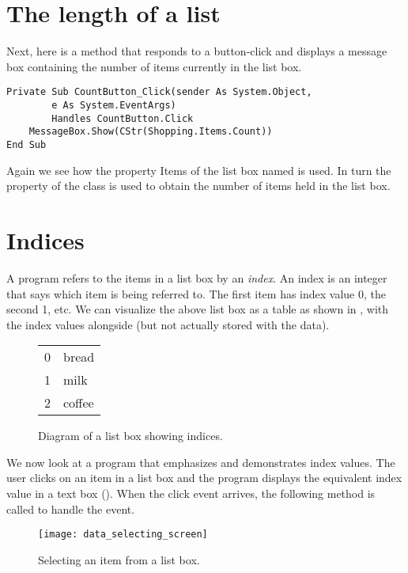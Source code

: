 	\section{The length of a list}
		Next, here is a method that responds to a button-click and displays a message box containing the number of items currently in the list box.
		\begin{lstlisting}
Private Sub CountButton_Click(sender As System.Object,
		e As System.EventArgs)
		Handles CountButton.Click
	MessageBox.Show(CStr(Shopping.Items.Count))
End Sub
		\end{lstlisting}
		Again we see how the property Items of the list box named  is used. In turn the property  of the  class is used to obtain the number of items held in the list box.

	\section{Indices}
	A program refers to the items in a list box by an \emph{index}. An index is an integer that says which item is being referred to. The first item has index value 0, the second 1, etc. We can visualize the above list box as a table as shown in , with the index values alongside (but not actually stored with the data).
		\begin{figure}[bth]
			\centering
			\begin{tabular}{l|l|}
				\cline{2-2}
				0 & bread\\ \cline{2-2}
				1 & milk\\ \cline{2-2}
				2 & coffee\\ \cline{2-2}
			\end{tabular}
			\caption{Diagram of a list box showing indices.}
			\label{fig:data_diagram_indices}
		\end{figure}
		
		We now look at a program that emphasizes and demonstrates index values. The user clicks on an item in a list box and the program displays the equivalent index value in a text box (). When the click event arrives, the following method is called to handle the event.
		\begin{figure}[bth]
			\centering
			\texttt{[image: data\_selecting\_screen]}
			\caption{Selecting an item from a list box.}
			\label{fig:data_selecting_screen}
		\end{figure}

